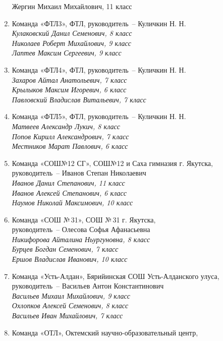 \begin{enumerate}
\indent Жергин Михаил Михайлович, 11 класс
\rm
\item
Команда «ФТЛ3», ФТЛ, руководитель~– Куличкин Н. Н.\\
\it
\indent Кулаковский Данил Семенович, 8 класс\\
\indent Николаев Роберт Михайлович, 9 класс\\
\indent Лаптев Максим Сергеевич, 9 класс
\rm
\item
Команда «ФТЛ4», ФТЛ, руководитель~– Куличкин Н. Н.\\
\it
\indent Захаров Айтал Анатольевич, 7 класс\\
\indent Крылыков Максим Игоревич, 6 класс\\
\indent Павловский Владислав Витальевич, 7 класс
\rm
\item
Команда «ФТЛ5», ФТЛ, руководитель~– Куличкин Н. Н.\\
\it
\indent Матвеев Александр Лукич, 8 класс\\
\indent Попов Кирилл Александрович, 7 класс\\
\indent Местников Марат Павлович, 6 класс
\rm
\item
Команда «СОШ№12 СГ», СОШ№12 и Саха гимназия г. Якутска, \\
руководитель~– Иванов Степан Николаевич\\
\it
\indent Иванов Данил Степанович, 11 класс\\
\indent Иванов Алексей Степанович, 6 класс\\
\indent Наумов Николай Максимович, 10 класс
\rm
\item
Команда «СОШ №\,31», СОШ №\,31 г. Якутска, \\руководитель~– Олесова Софья Афанасьевна\\
\it
\indent Никифорова Айталина Ньургуновна, 8 класс\\
\indent Бурцев Богдан Семенович, 7 класс\\
\indent Ершов Владислав Иванович, 10 класс
\rm
\item
Команда «Усть-Алдан», Бярийинская СОШ Усть-Алданского улуса, \\
руководитель~– Васильев Антон Константинович\\
\it
\indent Васильев Михаил Михайлович, 9 класс\\
\indent Охлопков Алексей Семенович, 8 класс\\
\indent Васильев Иван Михайлович, 7 класс
\rm
\item
Команда «ОТЛ», Октемский научно-образовательный центр, \\

\end{enumerate}
